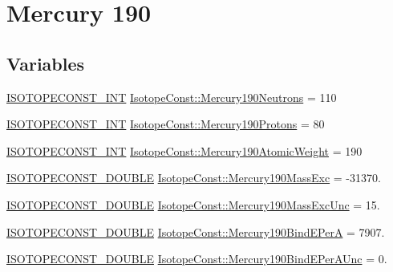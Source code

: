 \hypertarget{group___isotope_const-_mercury-_hg190}{}\section{Mercury 190}
\label{group___isotope_const-_mercury-_hg190}
\subsection*{Variables}
\begin{DoxyCompactItemize}
\item 
\mbox{\hyperlink{group___isotope_const-_macros_ga5f18360b3e99483a35c32d789e62621c}{I\+S\+O\+T\+O\+P\+E\+C\+O\+N\+S\+T\+\_\+\+I\+NT}} \mbox{\hyperlink{group___isotope_const-_mercury-_hg190_ga1fdea4906501a76fbcc6cc21fd0cf7a0}{Isotope\+Const\+::\+Mercury190\+Neutrons}} = 110
\item 
\mbox{\hyperlink{group___isotope_const-_macros_ga5f18360b3e99483a35c32d789e62621c}{I\+S\+O\+T\+O\+P\+E\+C\+O\+N\+S\+T\+\_\+\+I\+NT}} \mbox{\hyperlink{group___isotope_const-_mercury-_hg190_gad252ad6e9ee72b03b8114a608e2ef9f5}{Isotope\+Const\+::\+Mercury190\+Protons}} = 80
\item 
\mbox{\hyperlink{group___isotope_const-_macros_ga5f18360b3e99483a35c32d789e62621c}{I\+S\+O\+T\+O\+P\+E\+C\+O\+N\+S\+T\+\_\+\+I\+NT}} \mbox{\hyperlink{group___isotope_const-_mercury-_hg190_ga59c4205979736ed26d1c50407512389d}{Isotope\+Const\+::\+Mercury190\+Atomic\+Weight}} = 190
\item 
\mbox{\hyperlink{group___isotope_const-_macros_ga8f45a7272ce02c0b4c65c44636ed719a}{I\+S\+O\+T\+O\+P\+E\+C\+O\+N\+S\+T\+\_\+\+D\+O\+U\+B\+LE}} \mbox{\hyperlink{group___isotope_const-_mercury-_hg190_ga4f2d0b7bccb3d1d8333be5a876a43874}{Isotope\+Const\+::\+Mercury190\+Mass\+Exc}} = -\/31370.
\item 
\mbox{\hyperlink{group___isotope_const-_macros_ga8f45a7272ce02c0b4c65c44636ed719a}{I\+S\+O\+T\+O\+P\+E\+C\+O\+N\+S\+T\+\_\+\+D\+O\+U\+B\+LE}} \mbox{\hyperlink{group___isotope_const-_mercury-_hg190_gaf9a9a71b072df083e03979e98ab99eb6}{Isotope\+Const\+::\+Mercury190\+Mass\+Exc\+Unc}} = 15.
\item 
\mbox{\hyperlink{group___isotope_const-_macros_ga8f45a7272ce02c0b4c65c44636ed719a}{I\+S\+O\+T\+O\+P\+E\+C\+O\+N\+S\+T\+\_\+\+D\+O\+U\+B\+LE}} \mbox{\hyperlink{group___isotope_const-_mercury-_hg190_gadd1f0ebb7e2dd8a7e0d60166ecd80769}{Isotope\+Const\+::\+Mercury190\+Bind\+E\+PerA}} = 7907.
\item 
\mbox{\hyperlink{group___isotope_const-_macros_ga8f45a7272ce02c0b4c65c44636ed719a}{I\+S\+O\+T\+O\+P\+E\+C\+O\+N\+S\+T\+\_\+\+D\+O\+U\+B\+LE}} \mbox{\hyperlink{group___isotope_const-_mercury-_hg190_gac5a468fbb88137c9ba5c8e356d6e8398}{Isotope\+Const\+::\+Mercury190\+Bind\+E\+Per\+A\+Unc}} = 0.

\end{DoxyCompactItemize}
